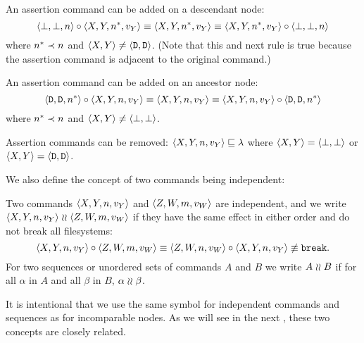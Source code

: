 \begin{myax}\label{ax_child_assert}
An assertion command can be added on a descendant node:
\[ \langle{\bot,\bot,n}\rangle\circ\langle{X,Y,n^*,v_Y}\rangle \equiv \langle{X,Y,n^*,v_Y}\rangle \equiv \langle{X,Y,n^*,v_Y}\rangle\circ\langle{\bot,\bot,n}\rangle \] 
where $n^*\prec n$ and $\langle{X,Y}\rangle\neq\langle{\mathtt{D},\mathtt{D}}\rangle$.
(Note that this and next rule is true because the assertion command is
adjacent to the original command.)
\end{myax}

\begin{myax}\label{ax_parent_assert}
An assertion command can be added on an ancestor node:
\[ \langle{\mathtt{D},\mathtt{D},n^*}\rangle\circ\langle{X,Y,n,v_Y}\rangle \equiv \langle{X,Y,n,v_Y}\rangle \equiv \langle{X,Y,n,v_Y}\rangle\circ\langle{\mathtt{D},\mathtt{D},n^*}\rangle \]
where $n^*\prec n$ and $\langle{X,Y}\rangle\neq\langle{\bot,\bot}\rangle$.
\end{myax}

\begin{myax}\label{ax_assert}
Assertion commands can be removed:
$\langle{X,Y,n,v_Y}\rangle \sqsubseteq \lambda$ where $\langle{X,Y}\rangle=\langle{\bot,\bot}\rangle$ or $\langle{X,Y}\rangle=\langle{\mathtt{D},\mathtt{D}}\rangle$.
\end{myax}



\bigskip

\noindent
We also define the concept of two commands being independent:

\begin{mydef}\label{def_indep}
Two commands $\langle{X,Y,n,v_Y}\rangle$ and $\langle{Z,W,m,v_W}\rangle$ 
are independent, and we write $\langle{X,Y,n,v_Y}\rangle\mathrel{\wr\wr}\langle{Z,W,m,v_W}\rangle$ if 
they have the same effect in either order and do not break all filesystems:
\[ \langle{X,Y,n,v_Y}\rangle\circ\langle{Z,W,m,v_W}\rangle \equiv \langle{Z,W,n,v_W}\rangle\circ\langle{X,Y,n,v_Y}\rangle \not\equiv \mathtt{break}. \]
For two sequences or unordered sets of commands $A$ and $B$ we write $A\mathrel{\wr\wr} B$ if
for all $\alpha$ in $A$ and all $\beta$ in $B$, $\alpha\mathrel{\wr\wr}\beta$.
\end{mydef}

It is intentional that we use the same symbol for independent commands
and sequences as for incomparable nodes. As we will see in the next
,
these two concepts are closely related.

